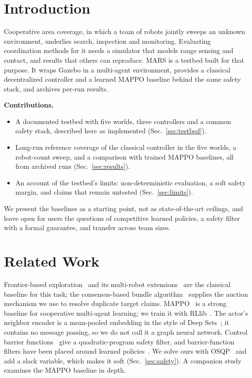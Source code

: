 \documentclass[conference]{IEEEtran}
\begin{document}
\section{Introduction}
Cooperative area coverage, in which a team of robots jointly sweeps an unknown
environment, underlies search, inspection and monitoring. Evaluating
coordination methods for it needs a simulator that models range sensing and
contact, and results that others can reproduce. MARS is a testbed built for
that purpose. It wraps Gazebo in a multi-agent environment, provides a
classical decentralized controller and a learned MAPPO baseline behind the
same safety stack, and archives per-run results.

\noindent\textbf{Contributions.}
\begin{itemize}
  \item A documented testbed with five worlds, three controllers and a common
        safety stack, described here as implemented (Sec.~\ref{sec:testbed}).
  \item Long-run reference coverage of the classical controller in the five worlds, a
        robot-count sweep, and a comparison with trained MAPPO baselines, all
        from archived runs (Sec.~\ref{sec:results}).
  \item An account of the testbed's limits: non-deterministic evaluation, a
        soft safety margin, and claims that remain untested
        (Sec.~\ref{sec:limits}).
\end{itemize}
We present the baselines as a starting point, not as state-of-the-art ceilings, and leave open for users the questions of competitive learned policies, a safety filter with a formal guarantee, and transfer across team sizes.

\section{Related Work}
Frontier-based exploration~\cite{yamauchi1997frontier} and its multi-robot
extensions~\cite{burgard2005coordinated,amigoni2017multirobot} are the
classical baseline for this task; the consensus-based bundle
algorithm~\cite{choi2009cbaa} supplies the auction mechanism we use to resolve
duplicate target claims. MAPPO~\cite{yu2022mappo} is a strong baseline for
cooperative multi-agent learning; we train it with
RLlib~\cite{liang2018rllib}. The actor's neighbor encoder is a mean-pooled
embedding in the style of Deep Sets~\cite{zaheer2017deepsets}; it contains no
message passing, so we do not call it a graph neural network. Control barrier
functions~\cite{ames2019cbf} give a quadratic-program safety filter, and
barrier-function filters have been placed around learned
policies~\cite{cheng2019end}. We solve ours with OSQP~\cite{stellato2020osqp}
and add a slack variable, which makes it soft (Sec.~\ref{sec:safety}). A
companion study~\cite{pandhe2026mappo} examines the MAPPO baseline in depth.
\end{document}
